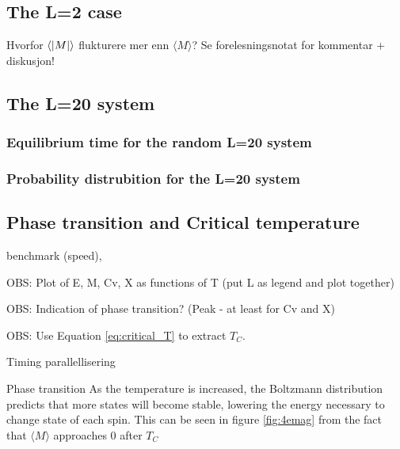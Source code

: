 



\subsection{The L=2 case}

Hvorfor $ \langle \abs{M} \rangle $ flukturere mer enn $ \langle {M} \rangle $?
	Se forelesningsnotat for kommentar + diskusjon!
\subsection{The L=20 system}






\subsubsection{Equilibrium time  for the random L=20 system}



\subsubsection{Probability distrubition  for the L=20 system}



\subsection{Phase transition and Critical temperature}



benchmark (speed),

OBS: Plot of E, M, Cv, X as functions of T (put L as legend and plot together)

OBS: Indication of phase transition? (Peak - at least for Cv and X)

OBS: Use Equation \ref{eq:critical_T} to extract $T_C$.


Timing parallellisering





Phase transition
As the temperature is increased, the Boltzmann distribution predicts that more states will become stable, lowering the energy necessary to change state of each spin. This can be seen  in figure \ref{fig:4emag} from the fact that $ \langle M \rangle $ approaches 0 after $ T_C $